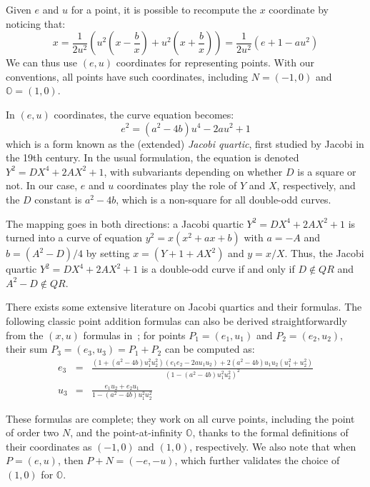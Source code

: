 \documentclass{llncs}
\newcommand{\QR}{QR}
\newcommand{\neutral}{\mathbb{O}}
\begin{document}
Given $e$ and $u$ for a point, it is possible to recompute the $x$
coordinate by noticing that:
\begin{equation*}
    x = \frac{1}{2u^2}\left(u^2\left(x - \frac{b}{x}\right)
                            + u^2\left(x + \frac{b}{x}\right)\right)
      = \frac{1}{2u^2}\left(e + 1 - au^2\right)
\end{equation*}
We can thus use $(e,u)$ coordinates for representing points. With our
conventions, all points have such coordinates, including $N = (-1,0)$
and $\neutral = (1,0)$.

In $(e,u)$ coordinates, the curve equation becomes:
\begin{equation*}
    e^2 = (a^2-4b)u^4 - 2au^2 + 1
\end{equation*}
which is a form known as the (extended) \emph{Jacobi quartic}, first
studied by Jacobi in the 19th century\cite{Jac1829}. In the usual
formulation, the equation is denoted $Y^2 = DX^4 + 2AX^2 + 1$, with
subvariants depending on whether $D$ is a square or not. In our case,
$e$ and $u$ coordinates play the role of $Y$ and $X$, respectively, and
the $D$ constant is $a^2-4b$, which is a non-square for all double-odd
curves.

The mapping goes in both directions: a Jacobi quartic
$Y^2 = DX^4 + 2AX^2 + 1$ is turned into a curve of equation
$y^2 = x(x^2 + ax + b)$ with $a = -A$ and $b = (A^2 - D)/4$ by
setting $x = (Y + 1 + AX^2)$ and $y = x/X$. Thus, the Jacobi quartic
$Y^2 = DX^4 + 2AX^2 + 1$ is a double-odd curve if and only if
$D\notin\QR$ and $A^2-D \notin\QR$.

There exists some extensive literature on Jacobi quartics and their
formulas\cite{BilJoy2003,ChuChu1986,Jac1829,WhiWat1927}. The following
classic point addition formulas can also be derived straightforwardly
from the $(x,u)$ formulas in~\cite{Por2020-5}; for points
$P_1 = (e_1, u_1)$ and $P_2 = (e_2, u_2)$, their sum
$P_3 = (e_3, u_3) = P_1 + P_2$ can be computed as:
\begin{eqnarray*}
    e_3 &=& \frac{(1 + (a^2 - 4b) u_1^2 u_2^2)(e_1 e_2 - 2a u_1 u_2)
                  + 2(a^2 - 4b) u_1 u_2 (u_1^2 + u_2^2)}
                 {(1 - (a^2 - 4b) u_1^2 u_2^2)^2} \\
    u_3 &=& \frac{e_1 u_2 + e_2 u_1}{1 - (a^2 - 4b) u_1^2 u_2^2}
\end{eqnarray*}

These formulas are complete; they work on all curve points, including
the point of order two $N$, and the point-at-infinity $\neutral$, thanks
to the formal definitions of their coordinates as $(-1,0)$ and $(1,0)$,
respectively. We also note that when $P = (e,u)$, then $P+N = (-e,-u)$,
which further validates the choice of $(1,0)$ for $\neutral$.
\end{document}
